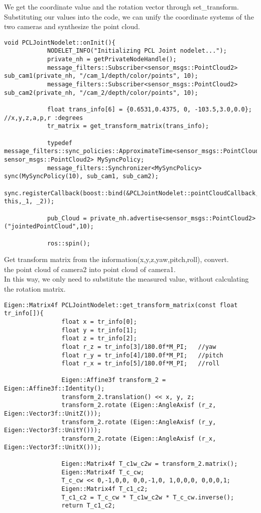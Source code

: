 	We get the coordinate value and the rotation vector through set\_transform. Substituting our values into the code, we can unify the coordinate systems of the two cameras and synthesize the point cloud.
	\begin{lstlisting}[caption={}]
		void PCLJointNodelet::onInit(){
			NODELET_INFO("Initializing PCL Joint nodelet...");
			private_nh = getPrivateNodeHandle();
			message_filters::Subscriber<sensor_msgs::PointCloud2> sub_cam1(private_nh, "/cam_1/depth/color/points", 10);
			message_filters::Subscriber<sensor_msgs::PointCloud2> sub_cam2(private_nh, "/cam_2/depth/color/points", 10);
			
			float trans_info[6] = {0.6531,0.4375, 0, -103.5,3.0,0.0};  //x,y,z,a,p,r :degrees
			tr_matrix = get_transform_matrix(trans_info);
			
			typedef message_filters::sync_policies::ApproximateTime<sensor_msgs::PointCloud2, sensor_msgs::PointCloud2> MySyncPolicy;
			message_filters::Synchronizer<MySyncPolicy> sync(MySyncPolicy(10), sub_cam1, sub_cam2);
			sync.registerCallback(boost::bind(&PCLJointNodelet::pointCloudCallback, this,_1, _2));
			
			pub_Cloud = private_nh.advertise<sensor_msgs::PointCloud2>("jointedPointCloud",10);
			
			ros::spin();
		\end{lstlisting}
		
		Get transform matrix from the information(x,y,z,yaw,pitch,roll), convert.\\
		the point cloud of camera2 into point cloud of camera1.\\
		In this way, we only need to substitute the measured value, without calculating the rotation matrix.\\
		
		\begin{lstlisting}[caption={}]
			Eigen::Matrix4f PCLJointNodelet::get_transform_matrix(const float tr_info[]){
				float x = tr_info[0];
				float y = tr_info[1];
				float z = tr_info[2];
				float r_z = tr_info[3]/180.0f*M_PI;   //yaw
				float r_y = tr_info[4]/180.0f*M_PI;   //pitch
				float r_x = tr_info[5]/180.0f*M_PI;   //roll
				
				Eigen::Affine3f transform_2 = Eigen::Affine3f::Identity();
				transform_2.translation() << x, y, z;
				transform_2.rotate (Eigen::AngleAxisf (r_z, Eigen::Vector3f::UnitZ()));
				transform_2.rotate (Eigen::AngleAxisf (r_y, Eigen::Vector3f::UnitY()));
				transform_2.rotate (Eigen::AngleAxisf (r_x, Eigen::Vector3f::UnitX()));
				
				Eigen::Matrix4f T_c1w_c2w = transform_2.matrix();
				Eigen::Matrix4f T_c_cw;
				T_c_cw << 0,-1,0,0, 0,0,-1,0, 1,0,0,0, 0,0,0,1;
				Eigen::Matrix4f T_c1_c2;
				T_c1_c2 = T_c_cw * T_c1w_c2w * T_c_cw.inverse();
				return T_c1_c2;
			\end{lstlisting}
			
